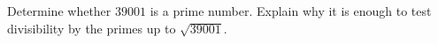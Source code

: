 Determine whether $39001$ is a prime number. Explain why it is enough to test divisibility by the primes up to $\sqrt{39001}$.
